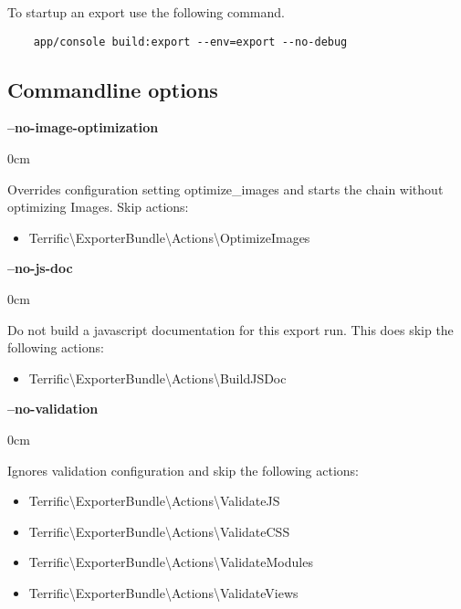 \newcommand{\cmdoptiondesc}[2]{
    \noindent \textbf{#1}\\
    \vspace{-1em}
    \begin{adjustwidth}{\parindent}{0cm}
        #2
    \end{adjustwidth}
    \vspace{1em}
}



To startup an export use the following command.

\begin{verbatim}
    app/console build:export --env=export --no-debug
\end{verbatim}



\subsection{Commandline options}

\cmdoptiondesc{--no-image-optimization}{
    Overrides configuration setting optimize\_images and starts the chain without optimizing Images. Skip actions:
    \begin{itemize}
          \item{Terrific\textnormal{\textbackslash}ExporterBundle\textnormal{\textbackslash}Actions\textnormal{\textbackslash}OptimizeImages}
    \end{itemize}
}

\cmdoptiondesc{--no-js-doc} {
    Do not build a javascript documentation for this export run. This does skip the following actions:
    \begin{itemize}
        \item{Terrific\textnormal{\textbackslash}ExporterBundle\textnormal{\textbackslash}Actions\textnormal{\textbackslash}BuildJSDoc}
    \end{itemize}
}

\cmdoptiondesc{--no-validation} {
    Ignores validation configuration and skip the following actions:
    \begin{itemize}
          \item{Terrific\textnormal{\textbackslash}ExporterBundle\textnormal{\textbackslash}Actions\textnormal{\textbackslash}ValidateJS}
          \item{Terrific\textnormal{\textbackslash}ExporterBundle\textnormal{\textbackslash}Actions\textnormal{\textbackslash}ValidateCSS}
          \item{Terrific\textnormal{\textbackslash}ExporterBundle\textnormal{\textbackslash}Actions\textnormal{\textbackslash}ValidateModules}
          \item{Terrific\textnormal{\textbackslash}ExporterBundle\textnormal{\textbackslash}Actions\textnormal{\textbackslash}ValidateViews}
    \end{itemize}
}

